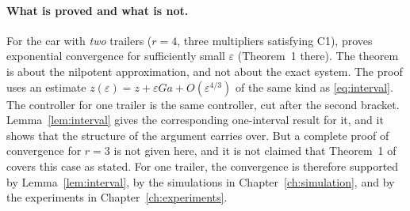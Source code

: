 \paragraph{What is proved and what is not.}
For the car with \emph{two} trailers ($r=4$, three multipliers satisfying C1),
\cite{zuyev2024} proves exponential convergence for sufficiently small
$\varepsilon$ (Theorem~1 there). The theorem is about the nilpotent
approximation, and not about the exact system. The proof uses an estimate
$z(\varepsilon)=z+\varepsilon G a+O(\varepsilon^{4/3})$ of the same kind as
\eqref{eq:interval}. The controller for one trailer is the same controller, cut
after the second bracket. Lemma~\ref{lem:interval} gives the corresponding
one-interval result for it, and it shows that the structure of the argument
carries over. But a complete proof of convergence for $r=3$ is not given here,
and it is not claimed that Theorem~1 of~\cite{zuyev2024} covers this case as
stated. For one trailer, the convergence is therefore supported by
Lemma~\ref{lem:interval}, by the simulations in Chapter~\ref{ch:simulation},
and by the experiments in Chapter~\ref{ch:experiments}.
\TODO[Ask the supervisor whether the r=3 convergence should be stated as a remark (as here), a conjecture, or a short proof; and how to cite her confirmation of the controller shape]
